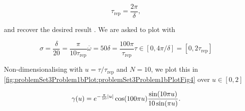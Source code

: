 {\begin{dmath}\label{eqn:modernOptics:problemSet3:1:620}
\tau_{\mathrm{rep}} = \frac{2 \pi}{\delta},
\end{dmath}

and recover the desired result .  We are asked to plot with

\begin{subequations}
\begin{equation}\label{eqn:modernOptics:problemSet3:1:640}
\sigma = \frac{\delta}{20} = \frac{\pi}{10 \tau_{\mathrm{rep}}}
\end{equation}
\begin{equation}\label{eqn:modernOptics:problemSet3:1:660}
\overbar{\omega} = 50 \delta = \frac{100 \pi}{\tau_{\mathrm{rep}}}
\end{equation}
\begin{equation}\label{eqn:modernOptics:problemSet3:1:680}
\tau \in [0, 4 \pi/\delta] = [0, 2 \tau_{\mathrm{rep}}]
\end{equation}
\end{subequations}

Non-dimensionalising with $u = \tau/\tau_{\mathrm{rep}}$ and $N = 10$, we plot this in \cref{fig:problemSet3Problem1bPlot:problemSet3Problem1bPlotFig4} over $u \in [0, 2]$

\begin{dmath}\label{eqn:modernOptics:problemSet3:1:700}
\gamma(u)
=
e^{ -\frac{\pi}{10} \Abs{u} }
\cos( 100 \pi u )
\frac{
\sin( 10 \pi u )
}
{
10 \sin( \pi u )
}.
\end{dmath}

}
